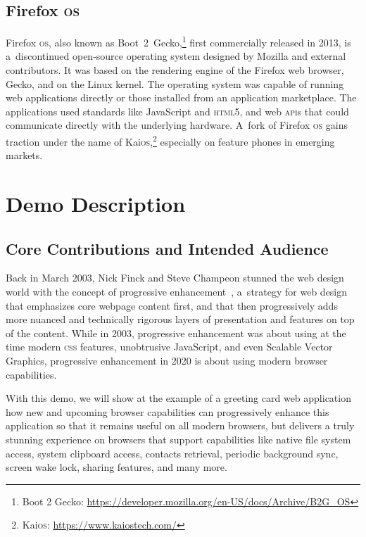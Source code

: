 \documentclass[sigconf, anonymous]{acmart}
\begin{document}
\subsection{Firefox \textsc{os}}

Firefox \textsc{os}, also known as
Boot~2~Gecko,\footnote{Boot 2 Gecko: \url{https://developer.mozilla.org/en-US/docs/Archive/B2G_OS}}
first commercially released in 2013,
is a~discontinued open-source operating system
designed by Mozilla and external contributors.
It was based on the rendering engine of the Firefox web browser, Gecko,
and on the Linux kernel.
The operating system was capable of running web applications directly
or those installed from an application marketplace.
The applications used standards like JavaScript and \textsc{html}5,
and web \textsc{api}s that could communicate directly with the underlying hardware.
A~fork of Firefox \textsc{os} gains traction under the name of
Kai\textsc{os},\footnote{Kai\textsc{os}: \url{https://www.kaiostech.com/}}
especially on feature phones in emerging markets.

\section{Demo Description}

\subsection{Core Contributions and Intended Audience}

Back in March 2003, Nick Finck and Steve Champeon stunned the web design world
with the concept of progressive enhancement~\cite{champeon03},
a~strategy for web design that emphasizes core webpage content first,
and that then progressively adds more nuanced and technically rigorous layers
of presentation and features on top of the content.
While in 2003, progressive enhancement was about using at the time modern \textsc{css} features,
unobtrusive JavaScript, and even Scalable Vector Graphics,
progressive enhancement in 2020 is about using modern browser capabilities.

With this demo, we will show at the example of a greeting card web application
how new and upcoming browser capabilities can progressively enhance
this application so that it remains useful on all modern browsers,
but delivers a truly stunning experience on browsers that support capabilities
like native file system access, system clipboard access, contacts retrieval,
periodic background sync, screen wake lock, sharing features, and many more.
\end{document}
